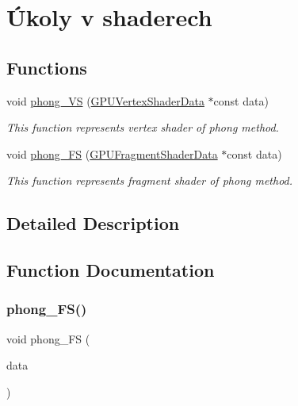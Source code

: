 \hypertarget{group__shader__side}{}\section{Úkoly v shaderech}
\label{group__shader__side}
\subsection*{Functions}
\begin{DoxyCompactItemize}
\item 
void \hyperlink{group__shader__side_gaed1d11e6e120b6a6513075c2e2c7ab19}{phong\+\_\+\+VS} (\hyperlink{structGPUVertexShaderData}{G\+P\+U\+Vertex\+Shader\+Data} $\ast$const data)
\begin{DoxyCompactList}\small\item\em This function represents vertex shader of phong method. \end{DoxyCompactList}\item 
void \hyperlink{group__shader__side_gae61352614f36dbf1625c51d6963d1aeb}{phong\+\_\+\+FS} (\hyperlink{structGPUFragmentShaderData}{G\+P\+U\+Fragment\+Shader\+Data} $\ast$const data)
\begin{DoxyCompactList}\small\item\em This function represents fragment shader of phong method. \end{DoxyCompactList}\end{DoxyCompactItemize}


\subsection{Detailed Description}


\subsection{Function Documentation}
\mbox{\label{group__shader__side_gae61352614f36dbf1625c51d6963d1aeb}} 
\subsubsection{\texorpdfstring{phong\+\_\+\+F\+S()}{phong\_FS()}}
{\footnotesize\ttfamily void phong\+\_\+\+FS (\begin{DoxyParamCaption}\item[{\hyperlink{structGPUFragmentShaderData}{G\+P\+U\+Fragment\+Shader\+Data} $\ast$const}]{data }\end{DoxyParamCaption})}



